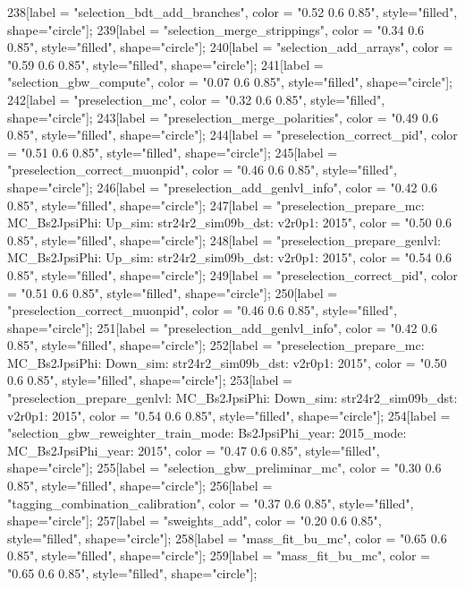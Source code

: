 {	238[label = "selection_bdt_add_branches", color = "0.52 0.6 0.85", style="filled", shape="circle"];
	239[label = "selection_merge_strippings", color = "0.34 0.6 0.85", style="filled", shape="circle"];
	240[label = "selection_add_arrays", color = "0.59 0.6 0.85", style="filled", shape="circle"];
	241[label = "selection_gbw_compute", color = "0.07 0.6 0.85", style="filled", shape="circle"];
	242[label = "preselection_mc", color = "0.32 0.6 0.85", style="filled", shape="circle"];
	243[label = "preselection_merge_polarities", color = "0.49 0.6 0.85", style="filled", shape="circle"];
	244[label = "preselection_correct_pid", color = "0.51 0.6 0.85", style="filled", shape="circle"];
	245[label = "preselection_correct_muonpid", color = "0.46 0.6 0.85", style="filled", shape="circle"];
	246[label = "preselection_add_genlvl_info", color = "0.42 0.6 0.85", style="filled", shape="circle"];
	247[label = "preselection_prepare_mc\nmode: MC_Bs2JpsiPhi\npolarity: Up\nstrip_sim: str24r2_sim09b_dst\nversion: v2r0p1\nyear: 2015", color = "0.50 0.6 0.85", style="filled", shape="circle"];
	248[label = "preselection_prepare_genlvl\nmode: MC_Bs2JpsiPhi\npolarity: Up\nstrip_sim: str24r2_sim09b_dst\nversion: v2r0p1\nyear: 2015", color = "0.54 0.6 0.85", style="filled", shape="circle"];
	249[label = "preselection_correct_pid", color = "0.51 0.6 0.85", style="filled", shape="circle"];
	250[label = "preselection_correct_muonpid", color = "0.46 0.6 0.85", style="filled", shape="circle"];
	251[label = "preselection_add_genlvl_info", color = "0.42 0.6 0.85", style="filled", shape="circle"];
	252[label = "preselection_prepare_mc\nmode: MC_Bs2JpsiPhi\npolarity: Down\nstrip_sim: str24r2_sim09b_dst\nversion: v2r0p1\nyear: 2015", color = "0.50 0.6 0.85", style="filled", shape="circle"];
	253[label = "preselection_prepare_genlvl\nmode: MC_Bs2JpsiPhi\npolarity: Down\nstrip_sim: str24r2_sim09b_dst\nversion: v2r0p1\nyear: 2015", color = "0.54 0.6 0.85", style="filled", shape="circle"];
	254[label = "selection_gbw_reweighter_train\ndata_mode: Bs2JpsiPhi\ndata_year: 2015\nmc_mode: MC_Bs2JpsiPhi\nmc_year: 2015", color = "0.47 0.6 0.85", style="filled", shape="circle"];
	255[label = "selection_gbw_preliminar_mc", color = "0.30 0.6 0.85", style="filled", shape="circle"];
	256[label = "tagging_combination_calibration", color = "0.37 0.6 0.85", style="filled", shape="circle"];
	257[label = "sweights_add", color = "0.20 0.6 0.85", style="filled", shape="circle"];
	258[label = "mass_fit_bu_mc", color = "0.65 0.6 0.85", style="filled", shape="circle"];
	259[label = "mass_fit_bu_mc", color = "0.65 0.6 0.85", style="filled", shape="circle"];
}
